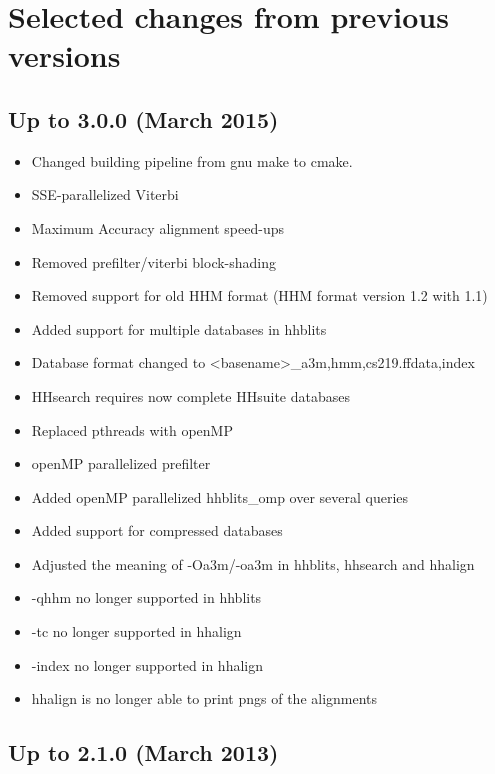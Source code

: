 \documentclass[11pt,a4paper]{article}
\begin{document}
\section{Selected changes from previous versions}


\subsection{Up to 3.0.0  (March 2015)}

\begin{itemize}
\item Changed building pipeline from gnu make to cmake.
\item SSE-parallelized Viterbi
\item Maximum Accuracy alignment speed-ups
\item Removed prefilter/viterbi block-shading
\item Removed support for old HHM format (HHM format version 1.2 with 1.1)
\item Added support for multiple databases in hhblits
\item Database format changed to <basename>\_{a3m,hmm,cs219}.ff{data,index}
\item HHsearch requires now complete HHsuite databases
\item Replaced pthreads with openMP
\item openMP parallelized prefilter
\item Added openMP parallelized hhblits\_omp over several queries
\item Added support for compressed databases
\item Adjusted the meaning of -Oa3m/-oa3m in hhblits, hhsearch and hhalign
\item -qhhm no longer supported in hhblits
\item -tc no longer supported in hhalign
\item -index no longer supported in hhalign
\item hhalign is no longer able to print pngs of the alignments
\end{itemize}


\subsection{Up to 2.1.0  (March 2013)}
\end{document}
